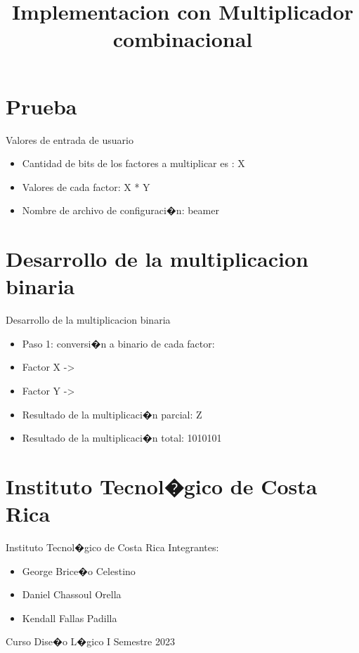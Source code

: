 \documentclass[11pt]{beamer}
\title{Implementacion con Multiplicador combinacional}
\begin{document}
    \begin{frame}
        \maketitle
    \end{frame}
    \section{Prueba}
    \begin{frame}{Valores de entrada de usuario}
        \begin{itemize}
        \item Cantidad de bits de los factores a multiplicar es : X
        \item Valores de cada factor: X * Y
        \item Nombre de archivo de configuraci�n: beamer
        \end{itemize}
    \end{frame}
    \section{Desarrollo de la multiplicacion binaria}
    \begin{frame}{Desarrollo de la multiplicacion binaria}
        \begin{itemize}
        \item Paso 1: conversi�n a binario de cada factor:
        \item    Factor X ->
        \item    Factor Y ->
        \item Resultado de la multiplicaci�n parcial: Z
        \item Resultado de la multiplicaci�n total: 1010101
        \end{itemize}
    \end{frame}
    \section{Instituto Tecnol�gico de Costa Rica}
    \begin{frame}{Instituto Tecnol�gico de Costa Rica}
        Integrantes:
        \begin{itemize}
        \item George Brice�o Celestino
        \item Daniel Chassoul Orella
        \item Kendall Fallas Padilla
        \end{itemize}
        Curso Dise�o L�gico 
        \newline
        I Semestre 2023
    \end{frame}
\end{document}
